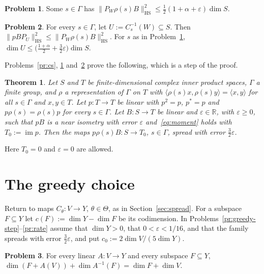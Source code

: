 \documentclass[reqno]{amsart}
\numberwithin{equation}{section}
\theoremstyle{definition}
\newtheorem{problem}{Problem}[section]
\theoremstyle{plain}
\newtheorem{theorem}{Theorem}[section]
\theoremstyle{remark}
\newcommand{\R}{\mathbb{R}}
\newcommand{\im}{\operatorname{im}}
\newcommand{\HS}{\mathrm{HS}}
\begin{document}
\begin{problem}\label{pr:one-translate}
Some \(s \in \Gamma\) has \(\lVert P_W\rho(s)B \rVert_\HS^2 \le \frac12(1 + \alpha + \varepsilon)\dim S\).
\end{problem}

\begin{problem}\label{pr:preimage}
For every \(s \in \Gamma\), let \(U := C_s^{-1}(W) \subseteq S\).  Then \(\lVert pBP_U \rVert_\HS^2 \le \lVert P_W\rho(s)B \rVert_\HS^2\).  For \(s\) as in Problem~\ref{pr:one-translate}, \(\dim U \le \bigl(\frac{1+\alpha}{2} + \frac32\varepsilon\bigr)\dim S\).
\end{problem}

Problems~\ref{pr:cs}, \ref{pr:one-translate} and~\ref{pr:preimage} prove the following, which is a step of the proof.

\begin{theorem}\label{thm:spread}
Let \(S\) and \(T\) be finite-dimensional complex inner product spaces, \(\Gamma\) a finite group, and \(\rho\) a representation of \(\Gamma\) on \(T\) with \(\langle \rho(s)x, \rho(s)y \rangle = \langle x, y \rangle\) for all \(s \in \Gamma\) and \(x, y \in T\).  Let \(p \colon T \to T\) be linear with \(p^2 = p\), \(p^* = p\) and \(p\rho(s) = \rho(s)p\) for every \(s \in \Gamma\).  Let \(B \colon S \to T\) be linear and \(\varepsilon \in \R\), with \(\varepsilon \ge 0\), such that \(pB\) is a near isometry with error \(\varepsilon\) and~\eqref{eq:moment} holds with \(T_0 := \im p\).  Then the maps \(p\rho(s)B \colon S \to T_0\), \(s \in \Gamma\), spread with error \(\frac32\varepsilon\).
\end{theorem}

Here \(T_0 = 0\) and \(\varepsilon = 0\) are allowed.

\section{The greedy choice}\label{sec:greedy}

Return to maps \(C_\theta \colon V \to Y\), \(\theta \in \Theta\), as in Section~\ref{sec:spread}.  For a subspace \(F \subseteq Y\) let \(c(F) := \dim Y - \dim F\) be its codimension.  In Problems~\ref{pr:greedy-step}--\ref{pr:rate} assume that \(\dim Y > 0\), that \(0 < \varepsilon < 1/16\), and that the family spreads with error \(\frac32\varepsilon\), and put \(c_0 := 2\dim V/(5\dim Y)\).

\begin{problem}\label{pr:rank-add}
For every linear \(A \colon V \to Y\) and every subspace \(F \subseteq Y\), \(\dim(F + A(V)) + \dim A^{-1}(F) = \dim F + \dim V\).
\end{problem}
\end{document}

